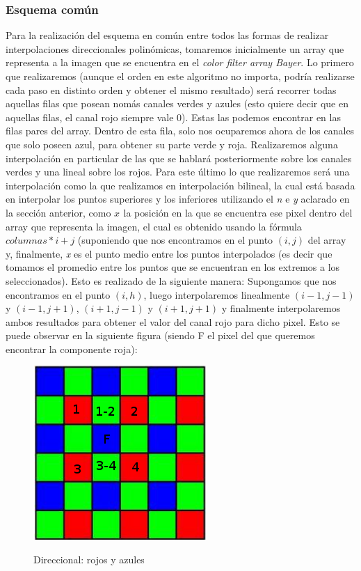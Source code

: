 \documentclass[10pt, a4paper]{article}
\begin{document}
\subsubsection{Esquema com\'un}

Para la realizaci\'on del esquema en com\'un entre todos las formas de realizar interpolaciones direccionales polin\'omicas, tomaremos inicialmente un array que representa a la imagen que se encuentra en el \textit{color filter array Bayer}. Lo primero que realizaremos (aunque el orden en este algoritmo no importa, podr\'ia realizarse cada paso en distinto orden y obtener el mismo resultado) ser\'a recorrer todas aquellas filas que posean nom\'as canales verdes y azules (esto quiere decir que en aquellas filas, el canal rojo siempre vale 0). Estas las podemos encontrar en las filas pares del array. Dentro de esta fila, solo nos ocuparemos ahora de los canales que solo poseen azul, para obtener su parte verde y roja. Realizaremos alguna interpolaci\'on en particular de las que se hablar\'a posteriormente sobre los canales verdes y una lineal sobre los rojos. Para este \'ultimo lo que realizaremos ser\'a una interpolaci\'on como la que realizamos en interpolaci\'on bilineal, la cual est\'a basada en interpolar los puntos superiores y los inferiores utilizando el \textit{n} e \textit{y} aclarado en la secci\'on anterior, como \textit{$x_{}$} la posici\'on en la que se encuentra ese pixel dentro del array que representa la imagen, el cual es obtenido usando la f\'ormula $columnas*i+j$ (suponiendo que nos encontramos en el punto $(i,j)$ del array y, finalmente, \textit{x} es el punto medio entre los puntos interpolados (es decir que tomamos el promedio entre los puntos que se encuentran en los extremos a los seleccionados). Esto es realizado de la siguiente manera: Supongamos que nos encontramos en el punto $(i,h)$, luego interpolaremos linealmente $(i-1,j-1)$ y $(i-1, j+1)$, $(i+1,j-1)$ y $(i+1, j+1)$ y finalmente interpolaremos ambos resultados para obtener el valor del canal rojo para dicho pixel. Esto se puede observar en la siguiente figura (siendo F el pixel del que queremos encontrar la componente roja):

\begin{figure}[H]
\centering
	{\includegraphics[scale=.3]{bayer1}}
	\caption{Direccional: rojos y azules} 
\end{figure}
\end{document}
